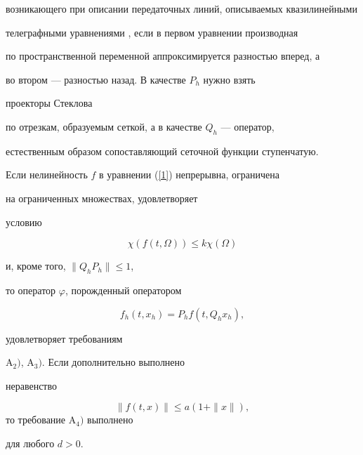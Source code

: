 возникающего при описании передаточных линий, описываемых квазилинейными


телеграфными уравнениями \cite{9}, если в первом уравнении производная 


по пространственной переменной аппроксимируется разностью вперед, а


во втором --- разностью назад. В качестве $P_h$ нужно взять


проекторы Стеклова


по отрезкам, образуемым сеткой, а в качестве $Q_h$ --- оператор,


естественным образом сопоставляющий сеточной функции ступенчатую. 





Если нелинейность $f$ в уравнении (\ref{1}) непрерывна, ограничена


на ограниченных множествах, удовлетворяет


условию


$$


\chi (f(t,\Omega))\leq k\chi (\Omega)


$$


и, кроме того, $\|Q_hP_h\|\leq 1$,


то оператор $\varphi$, порожденный оператором


$$f_h(t,x_h)=P_hf(t,Q_hx_h),


$$


удовлетворяет требованиям


$\mathrm A_2)$, $\mathrm A_3)$. Если дополнительно выполнено


неравенство


$$


\|f(t,x)\|\le a(1+\|x\|),


$$ то требование $\mathrm A_4)$ выполнено


для любого $d>0$. 





